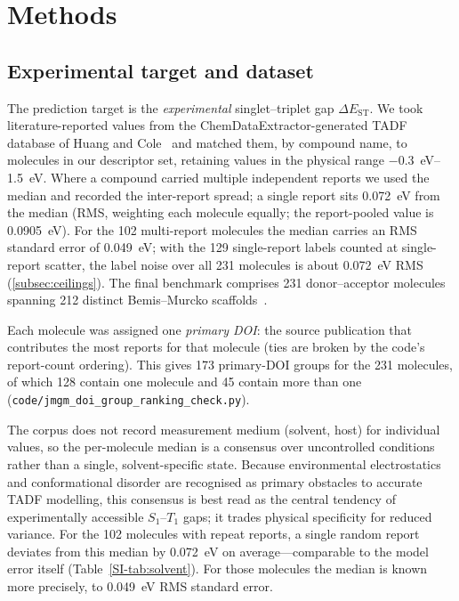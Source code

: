 
\section{Methods}\label{sec:methods}

\subsection{Experimental target and dataset}\label{para:validation_hierarchy}

The prediction target is the \emph{experimental} singlet--triplet gap
$\Delta E_\text{ST}$. We took literature-reported values from the ChemDataExtractor-generated TADF
database of Huang and Cole~\cite{HuangCole2024} and matched them, by compound name, to molecules in
our descriptor set, retaining values in the physical range
\qtyrange{-0.3}{1.5}{\electronvolt}. Where a compound carried multiple independent
reports we used the median and recorded the inter-report spread; a single report sits
\qty{0.072}{\electronvolt} from the median (RMS, weighting each molecule equally; the
report-pooled value is \qty{0.0905}{\electronvolt}). For the \num{102} multi-report
molecules the median carries an RMS standard error of \qty{0.049}{\electronvolt}; with the
\num{129} single-report labels counted at single-report scatter, the label noise over all
\num{231} molecules is about \qty{0.072}{\electronvolt} RMS (\cref{subsec:ceilings}). The final benchmark comprises \num{231} donor--acceptor
molecules spanning \num{212} distinct Bemis--Murcko scaffolds~\cite{Bemis1996}.

Each molecule was assigned one \emph{primary DOI}: the source publication that contributes
the most reports for that molecule (ties are broken by the
code's report-count ordering). This gives \num{173} primary-DOI groups for the \num{231} molecules, of
which \num{128} contain one molecule and \num{45} contain more than one
(\texttt{code/jmgm\_doi\_group\_ranking\_check.py}).

The corpus does not record measurement medium (solvent, host) for individual
values, so the per-molecule median is a consensus over uncontrolled conditions
rather than a single, solvent-specific state. Because environmental electrostatics
and conformational disorder are recognised as primary obstacles to accurate TADF
modelling,\cite{Olivier2017} this consensus is best read as the central tendency of
experimentally accessible $S_1$--$T_1$ gaps; it trades physical specificity for
reduced variance. For the \num{102} molecules with repeat reports, a single random
report deviates from this median by \qty{0.072}{\electronvolt} on
average---comparable to the model error itself
(Table~\ref{SI-tab:solvent}). For those molecules the median is known more precisely,
to \qty{0.049}{\electronvolt} RMS standard error.

